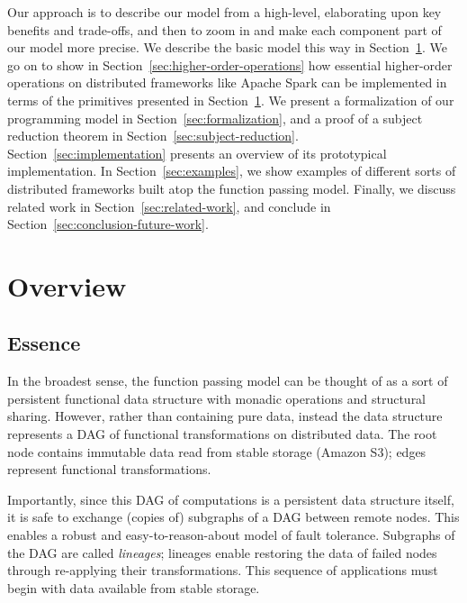 \documentclass{jfp1}
\begin{document}
Our approach is to describe our model from a high-level, elaborating upon key
benefits and trade-offs, and then to zoom in and make each component part of our
model more precise. We describe the basic model this way in
Section~\ref{sec:basic-model}. We go on to show in
Section~\ref{sec:higher-order-operations} how essential higher-order operations
on distributed frameworks like Apache Spark can be implemented in terms of the
primitives presented in Section~\ref{sec:basic-model}. We present a
formalization of our programming model in Section~\ref{sec:formalization}, and a
proof of a subject reduction theorem in Section~\ref{sec:subject-reduction}.
Section~\ref{sec:implementation} presents an overview of its prototypical
implementation. In Section~\ref{sec:examples}, we show examples of different
sorts of distributed frameworks built atop the function passing model. Finally,
we discuss related work in Section~\ref{sec:related-work}, and conclude in
Section~\ref{sec:conclusion-future-work}.

\section{Overview}
\label{sec:basic-model}

\subsection{Essence}

In the broadest sense, the function passing model can be thought of as a sort of
persistent functional data structure with monadic operations and structural
sharing. However, rather than containing pure data, instead the data structure
represents a DAG of functional transformations on distributed data. The root
node contains immutable data read from stable storage (\eg Amazon S3); edges
represent functional transformations.

Importantly, since this DAG of computations is a persistent data structure
itself, it is safe to exchange (copies of) subgraphs of a DAG between remote
nodes. This enables a robust and easy-to-reason-about model of fault tolerance.
Subgraphs of the DAG are called \textit{lineages}; lineages enable restoring the 
data of failed nodes through re-applying their transformations. This sequence of 
applications must begin with data available from stable storage.
\end{document}
